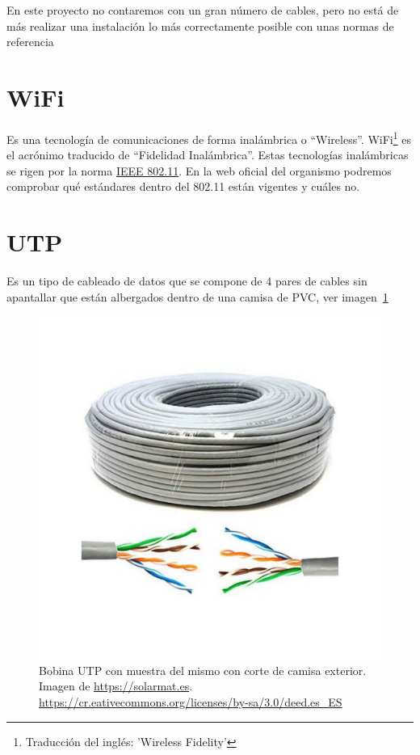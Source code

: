 En este proyecto no contaremos con un gran número de cables, pero no está de más realizar una instalación lo más correctamente posible con unas normas de referencia

\section{WiFi}
Es una tecnología de comunicaciones de forma inalámbrica o “Wireless”. WiFi\footnote{Traducción del inglés: 'Wireless Fidelity'} es el acrónimo traducido de “Fidelidad Inalámbrica”.
Estas tecnologías inalámbricas se rigen por la norma \underline{IEEE 802.11}\cite{manual:IEEE802.11}.
En la web oficial del organismo podremos comprobar qué estándares dentro del 802.11 están vigentes y cuáles no.

\section{UTP}
Es un tipo de cableado de datos que se compone de 4 pares de cables sin apantallar que están albergados dentro de una camisa de PVC, ver imagen~\ref{Img:Bobina UTP}

\begin{figure}
    \centering
    \includegraphics[width=.6\textwidth]{img/bobina_UTP.pdf}
    \caption[Bobina UTP]{Bobina UTP con muestra del mismo con corte de camisa exterior. Imagen de \url{https://solarmat.es}\cite{wiki:Creative}. \url{https://cr.eativecommons.org/licenses/by-sa/3.0/deed.es_ES} } \label{Img:Bobina UTP}
\end{figure}


